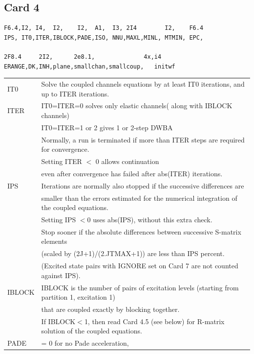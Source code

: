 \documentclass[11pt]{book}
\begin{document}
\subsection{Card 4}
\begin{verbatim}
F6.4,I2, I4,  I2,    I2,  A1,  I3, 2I4        I2,    F6.4
IPS, IT0,ITER,IBLOCK,PADE,ISO, NNU,MAXL,MINL, MTMIN, EPC,

2F8.4     2I2,      2e8.1,              4x,i4
ERANGE,DK,INH,plane,smallchan,smallcoup,   initwf
\end{verbatim}

\begin{longtable}{| p{} | p{} |} 
\hline 
IT0 & Solve the coupled channels equations by at least IT0 iterations, and
  up to ITER iterations. \\
ITER & IT0=ITER=0 solves only elastic channels( along with IBLOCK channels)\\
     & IT0=ITER=1 or 2 gives 1 or 2-step DWBA \\  
     & Normally, a run is terminated if more than ITER steps are required for
     convergence.  \\
     & Setting ITER $<$ 0 allows continuation \\ 
     & even after
     convergence has failed after abs(ITER) iterations.  \\
IPS  & Iterations are normally also stopped if the successive differences are\\
     & smaller
     than the errors estimated for the numerical integration of the coupled
     equations. \\
     & Setting IPS $< 0$ uses abs(IPS), without this extra check. \\
 & Stop sooner if the absolute differences between successive S-matrix
  elements \\
   & (scaled by (2J+1)/(2.JTMAX+1)) are less than IPS percent. \\
   & (Excited state pairs with IGNORE set on Card 7
  are not counted against IPS). \\
IBLOCK & IBLOCK is the number of pairs of excitation levels
(starting from partition 1, excitation 1) \\
      & that are coupled exactly by
blocking together.\\
   & If IBLOCK$<$1, then read Card 4.5 (see below) for R-matrix solution of the
coupled equations. \\
 \hline 
PADE &  = 0 for no Pade acceleration, \\

\end{longtable}
\end{document}
